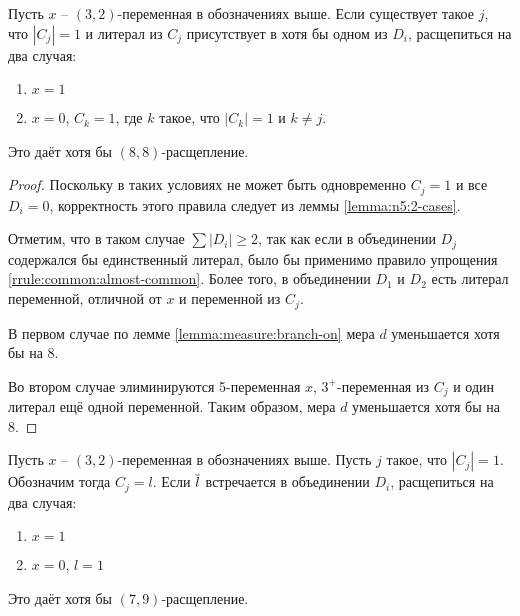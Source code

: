 \begin{brule}
 Пусть $x$ -- $(3,2)$-переменная в обозначениях выше. Если существует такое $j$, что $|C_j| = 1$ и литерал из $C_j$ присутствует в хотя бы одном из $D_i$, расщепиться на два случая:

 \begin{enumerate}
  \item $x = 1$
  \item $x = 0$, $C_k = 1$, где $k$ такое, что $|C_k| = 1$ и $k \neq j$.
 \end{enumerate}

 Это даёт хотя бы $(8,8)$-расщепление.
 \label{brule:n5:32-rest:same}
\end{brule}

\begin{proof}
 Поскольку в таких условиях не может быть одновременно $C_j = 1$ и все $D_i = 0$, корректность этого правила следует из леммы \ref{lemma:n5:2-cases}.

 Отметим, что в таком случае $\sum |D_i| \geq 2$, так как если в объединении $D_j$ содержался бы единственный литерал, было бы применимо правило упрощения \ref{rrule:common:almost-common}. Более того, в объединении $D_1$ и $D_2$ есть литерал переменной, отличной от $x$ и переменной из $C_j$.

 В первом случае по лемме \ref{lemma:measure:branch-on} мера $d$ уменьшается хотя бы на 8.

 Во втором случае элиминируются 5-переменная $x$, $3^+$-переменная из $C_j$ и один литерал ещё одной переменной. Таким образом, мера $d$ уменьшается хотя бы на 8.
\end{proof}

\begin{brule}
 Пусть $x$ -- $(3,2)$-переменная в обозначениях выше. Пусть $j$ такое, что $|C_j| = 1$. Обозначим тогда $C_j = l$. Если $\overline{l}$ встречается в объединении $D_i$, расщепиться на два случая:

 \begin{enumerate}
  \item $x = 1$
  \item $x = 0$, $l = 1$
 \end{enumerate}
 
 Это даёт хотя бы $(7,9)$-расщепление.
 \label{brule:n5:32-rest:compl}
\end{brule}

